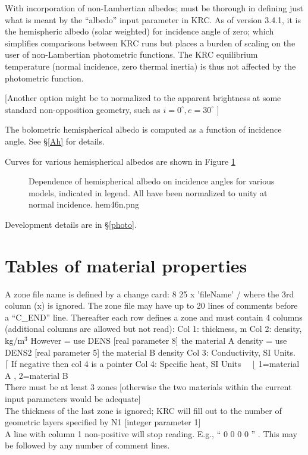 \documentclass{article}
\begin{document}
With incorporation of non-Lambertian albedos; must be thorough in defining just
what is meant by the ``albedo'' input parameter in KRC.  As of version 3.4.1, it
is the hemispheric albedo (solar weighted) for incidence angle of zero; which
simplifies comparisons between KRC runs but places a burden of scaling on the
user of non-Lambertian photometric functions. The  KRC equilibrium temperature
(normal incidence, zero thermal inertia) is thus not affected by the
photometric function.

[Another option might be to normalized to the apparent brightness at some
  standard non-opposition geometry, such as $i=0^\circ,  e=30^\circ$ ]
 
The bolometric hemispherical albedo is computed as a function of incidence
angle.  See \S \ref{Ah} for details.

Curves for various hemispherical albedos are shown in Figure 
\ref{hem46n}  
\begin{figure}[!ht] 
\caption[Various hemispherical albedos]{Dependence of hemispherical albedo on
  incidence angles for various models, indicated in legend. All have been
  normalized to unity at normal incidence.
\label{hem46n}  hem46n.png }
\end{figure} 

Development details are in \S \ref{photo}.  

\section{Tables of material properties \label{zone}}
A zone file name is defined by a change card: 8 25 x 'fileName' / where the 3rd column (x) is
ignored. The zone file may have up to 20 lines of comments before a ``C_END''
line. Thereafter each row defines a zone and must contain 4 columns (additional
columns are allowed but not read):
\qi Col 1: thickness, m
\qi Col 2: density, kg/m$^3$ \hspace{1.0 cm} However
 = use DENS [real parameter 8] the material A density
 = use DENS2 [real parameter 5] the material B density
\qi Col 3: Conductivity, SI Units. \ $\lceil$   If negative then col 4 is a pointer
\qi Col 4: Specific heat, SI Units \ \  $\lfloor$  1=material A , 2=material B 
\\ There must be at least 3 zones [otherwise the two materials within the current input parameters would be adequate]
\\ The thickness of the last zone is ignored; KRC will fill out to the number of geometric layers specified by N1 [integer parameter 1] 
\\ A line with column 1 non-positive will stop reading. E.g., `` 0 0 0 0 '' . This may be followed by any number of comment lines.
\end{document}
